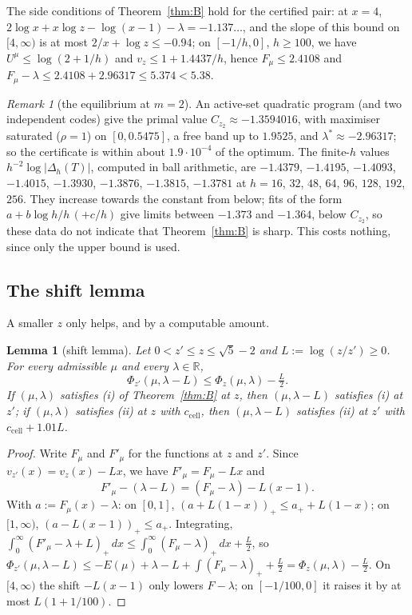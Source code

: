 \documentclass[11pt]{amsart}
\newtheorem{lemma}[theorem]{Lemma}
\theoremstyle{definition}
\theoremstyle{remark}
\newtheorem{remark}[theorem]{Remark}
\numberwithin{equation}{section}
\newcommand{\RR}{\mathbb{R}}
\newcommand{\ccell}{c_{\mathrm{cell}}}
\begin{document}
The side conditions of Theorem~\ref{thm:B} hold for the certified pair: at $x=4$,
$2\log x+x\log z-\log(x-1)-\lambda=-1.137\ldots$, and the slope of this bound on $[4,\infty)$ is at most
$2/x+\log z\le-0.94$; on $[-1/h,0]$, $h\ge100$, we have $U^\mu\le\log(2+1/h)$ and $v_z\le1+1.4437/h$, hence
$F_\mu\le2.4108$ and $F_\mu-\lambda\le2.4108+2.96317\le5.374<5.38$.

\begin{remark}[the equilibrium at $m=2$]\label{rem:equil}
An active-set quadratic program (and two independent codes) give the primal value $C_{z_2}\approx-1.3594016$, with
maximiser saturated ($\rho=1$) on $[0,0.5475]$, a free band up to $1.9525$, and $\lambda^*\approx-2.96317$; so the
certificate is within about $1.9\cdot10^{-4}$ of the optimum. The finite-$h$ values $h^{-2}\log|\Delta_h(T)|$, computed in
ball arithmetic, are $-1.4379$, $-1.4195$, $-1.4093$, $-1.4015$, $-1.3930$, $-1.3876$, $-1.3815$, $-1.3781$ at $h=16$,
$32$, $48$, $64$, $96$, $128$, $192$, $256$. They increase towards the constant from below; fits of the form
$a+b\log h/h\,(+c/h)$ give limits between $-1.373$ and $-1.364$, below $C_{z_2}$, so these data do not indicate that
Theorem~\ref{thm:B} is sharp. This costs nothing, since only the upper bound is used.
\end{remark}

\subsection{The shift lemma}\label{sec:shift}
A smaller $z$ only helps, and by a computable amount.

\begin{lemma}[shift lemma]\label{lem:shift}
Let $0<z'\le z\le\sqrt5-2$ and $L:=\log(z/z')\ge0$. For every admissible $\mu$ and every $\lambda\in\RR$,
\[
  \Phi_{z'}(\mu,\lambda-L)\le\Phi_z(\mu,\lambda)-\tfrac L2 .
\]
If $(\mu,\lambda)$ satisfies (i) of Theorem~\ref{thm:B} at $z$, then $(\mu,\lambda-L)$ satisfies (i) at $z'$; if
$(\mu,\lambda)$ satisfies (ii) at $z$ with $\ccell$, then $(\mu,\lambda-L)$ satisfies (ii) at $z'$ with
$\ccell+1.01L$.
\end{lemma}

\begin{proof}
Write $F_\mu$ and $F'_\mu$ for the functions at $z$ and $z'$. Since $v_{z'}(x)=v_z(x)-Lx$, we have $F'_\mu=F_\mu-Lx$ and
\[
  F'_\mu-(\lambda-L)=(F_\mu-\lambda)-L(x-1).
\]
With $a:=F_\mu(x)-\lambda$: on $[0,1]$, $(a+L(1-x))_+\le a_++L(1-x)$; on $[1,\infty)$, $(a-L(x-1))_+\le a_+$. Integrating,
$\int_0^\infty(F'_\mu-\lambda+L)_+\,dx\le\int_0^\infty(F_\mu-\lambda)_+\,dx+\frac L2$, so
$\Phi_{z'}(\mu,\lambda-L)\le-E(\mu)+\lambda-L+\int(F_\mu-\lambda)_++\frac L2=\Phi_z(\mu,\lambda)-\frac L2$. On $[4,\infty)$
the shift $-L(x-1)$ only lowers $F-\lambda$; on $[-1/100,0]$ it raises it by at most $L(1+1/100)$.
\end{proof}
\end{document}
